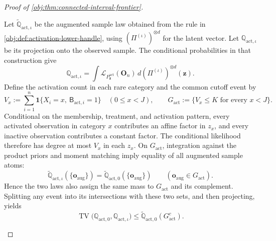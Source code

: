 \begin{proof}[Proof of \cref{obj:thm:connected-interval-frontier}]
\begin{enumerate}
Let \(\widetilde{\mathbb Q}_{\mathrm{act},\iota}\) be the augmented
sample law obtained from the rule in
\cref{obj:def:activation-lower-handle}, using
\((\Pi^{(\iota)})^{\otimes d}\) for the latent vector. Let
\(\mathbb Q_{\mathrm{act},\iota}\) be its projection onto the observed
sample. The conditional probabilities in that construction give
\[
\mathbb Q_{\mathrm{act},\iota}
=
\int
\mathcal L_{P^{\mathrm{act}}_{\mathbf z}}(\mathbf O_n)\,
d(\Pi^{(\iota)})^{\otimes d}(\mathbf z).
\]
Define the activation count in each rare category and the common cutoff
event by
\[
V_x:=\sum_{i=1}^n
\mathbf1\{X_i=x,\ \mathsf B_{\mathrm{act},i}=1\}
\quad(0\le x<J),
\qquad
G_{\mathrm{act}}:=\{V_x\le K\text{ for every }x<J\}.
\]
Conditional on the membership, treatment, and activation pattern, every
activated observation in category \(x\) contributes an affine factor in
\(z_x\), and every inactive observation contributes a constant factor.
The conditional likelihood therefore has degree at most \(V_x\) in each
\(z_x\). On \(G_{\mathrm{act}}\), integration against the product priors
and moment matching imply equality of all augmented sample atoms:
\[
\widetilde{\mathbb Q}_{\mathrm{act},\iota}(\{\mathbf o_{\mathrm{aug}}\})
=
\widetilde{\mathbb Q}_{\mathrm{act},0}(\{\mathbf o_{\mathrm{aug}}\})
\qquad(\mathbf o_{\mathrm{aug}}\in G_{\mathrm{act}}).
\]
Hence the two laws also assign the same mass to \(G_{\mathrm{act}}\)
and its complement. Splitting any event into its intersections with
these two sets, and then projecting, yields
\[
\operatorname{TV}
\bigl(\mathbb Q_{\mathrm{act},0},
      \mathbb Q_{\mathrm{act},\iota}\bigr)
\le
\widetilde{\mathbb Q}_{\mathrm{act},0}(G_{\mathrm{act}}^c).
\]


\end{enumerate}
\end{proof}

